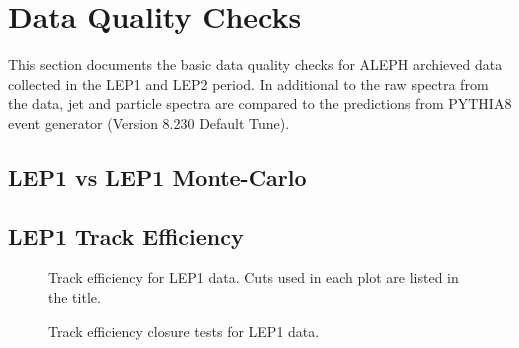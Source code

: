 \section{Data Quality Checks}

This section documents the basic data quality checks for ALEPH archieved data collected in the LEP1 and LEP2 period. In additional to the raw spectra from the data, jet and particle spectra are compared to the predictions from PYTHIA8 event generator (Version 8.230 Default Tune). 

\subsection{LEP1 vs LEP1 Monte-Carlo}
\begin{figure}[H]
\centering
{}\hfill
{}\hfill
{}\hfill
\caption{}  
\end{figure}

\subsection{LEP1 Track Efficiency}
\begin{figure}[H]
\centering
{}\hfill
{}\hfill
{}\hfill
\caption{Track efficiency for LEP1 data. Cuts used in each plot are listed in the title.}
\end{figure}

\begin{figure}[H]
\centering
{}\hfill
{}\hfill
{}\hfill
\caption{Track efficiency closure tests for LEP1 data.}
\end{figure}